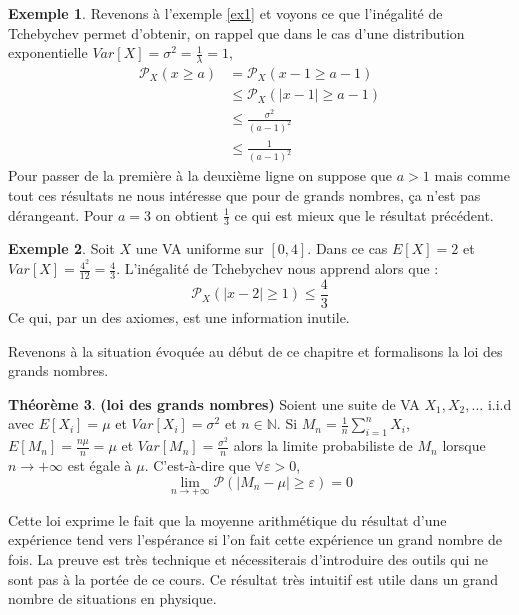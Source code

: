\documentclass[a4paper,12pt]{report}
\theoremstyle{definition}
\newcommand{\ra}{\rightarrow}
\newcommand{\N}{\mathbb{N}}
\renewcommand{\(}{\left(}
\renewcommand{\)}{\right)}
\renewcommand{\b}{\textbf}
\renewcommand{\P}{\mathcal{P}}
\newtheorem{thm}{Théorème}[section]
\newtheorem{exmp}[thm]{Exemple}
\begin{document}
        \begin{exmp}
            Revenons à l'exemple \ref{ex1} et voyons ce que l'inégalité de Tchebychev permet d'obtenir, on rappel que dans le cas d'une distribution exponentielle $Var[X] = \sigma^2 = \frac{1}{\lambda} = 1$,
            \begin{align*}
                \P_X(x\geq a) &= \P_X(x-1\geq a-1) \\
                &\leq \P_X(|x-1|\geq a-1) \\
                &\leq \frac{\sigma^2}{(a-1)^2}\\
                &\leq \frac{1}{(a-1)^2}
            \end{align*}
            Pour passer de la première à la deuxième ligne on suppose que $a>1$ mais comme tout ces résultats ne nous intéresse que pour de grands nombres, ça n'est pas dérangeant. Pour $a=3$ on obtient $\frac{1}{3}$ ce qui est mieux que le résultat précédent.
        \end{exmp}
        
        \begin{exmp}
            Soit $X$ une VA uniforme sur $[0,4]$. Dans ce cas $E[X]=2$ et $Var[X] = \frac{4^2}{12} = \frac{4}{3}$. L'inégalité de Tchebychev nous apprend alors que :
            $$\P_X(|x-2|\geq 1)\leq \frac{4}{3}$$
            Ce qui, par un des axiomes, est une information inutile.
        \end{exmp}
        
        Revenons à la situation évoquée au début de ce chapitre et formalisons la loi des grands nombres.
        
        \begin{leftbar}
        \begin{thm}\b{(loi des grands nombres)}
            Soient une suite de VA $X_1, X_2, \dots$ i.i.d avec $E[X_i] = \mu $ et $Var[X_i] = \sigma^2$ et $n\in\N$. Si $M_n = \frac{1}{n}\sum_{i=1}^n X_i$, $E[M_n] = \frac{n\mu}{n} = \mu$ et $Var[M_n] = \frac{\sigma^2}{n}$ alors la limite probabiliste de $M_n$ lorsque $n\ra+\infty$ est égale à $\mu$. C'est-à-dire que $\forall \varepsilon>0$, 
            $$\lim\limits_{n\ra+\infty}\P(|M_n-\mu|\geq \varepsilon) = 0$$
        \end{thm}
        \end{leftbar}
        
        Cette loi exprime le fait que la moyenne arithmétique du résultat d'une expérience tend vers l'espérance si l'on fait cette expérience un grand nombre de fois. La preuve est très technique et nécessiterais d'introduire des outils qui ne sont pas à la portée de ce cours. Ce résultat très intuitif est utile dans un grand nombre de situations en physique.\\
        
\end{document}
